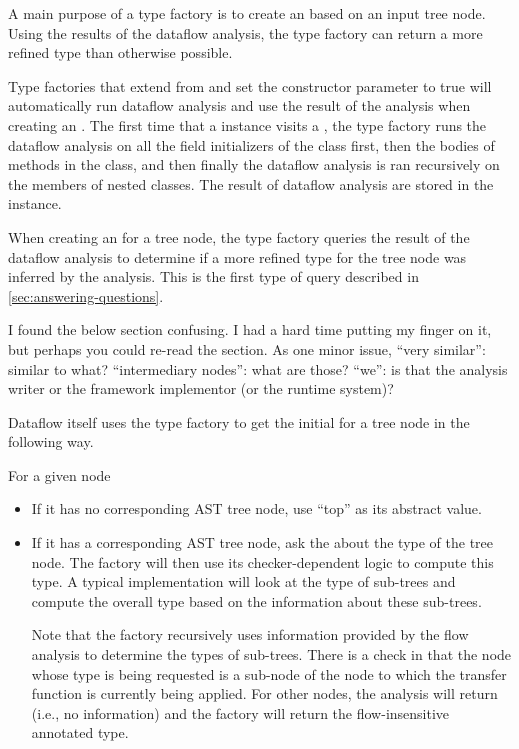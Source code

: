A main purpose of a type factory is to create an 
based on an input tree node. Using the results of the dataflow analysis,
the type factory can return a more refined type than otherwise possible.

Type factories that extend from 
and set the constructor parameter  to true will automatically
run dataflow analysis and use the result of the analysis when creating an
.  The first time that a 
instance visits a , the type factory runs the dataflow analysis on all the field initializers of the class first, then the bodies of methods in
the class, and then finally the dataflow analysis is
ran recursively on the members of nested classes. The result of
dataflow analysis are stored in the  instance.

When creating an  for a tree node, the type factory
queries the result of the dataflow analysis to determine if a more refined
type for the tree node was inferred by the analysis. This is the first
type of query described in \autoref{sec:answering-questions}.

\begin{workinprogress}
I found the below section confusing.  I had a hard time putting my finger
on it, but perhaps you could re-read the section.  As one minor issue,
``very similar'':  similar to what?  ``intermediary nodes'':  what are
those?  ``we'':  is that the analysis writer or the framework implementor
(or the runtime system)?
\end{workinprogress}

Dataflow itself uses the type factory to get the initial
 for a tree node in the following way.

For a given node 
\begin{itemize}
\item
    If it has no corresponding AST tree node, use ``top'' as its
    abstract value.
\item
    If it has a corresponding AST tree node, ask the
     about the type of the tree node.  The
    factory will then use its checker-dependent logic to compute this
    type.  A typical implementation will look at the type of sub-trees
    and compute the overall type based on the information about these
    sub-trees.

    Note that the factory recursively uses information provided by the
    flow analysis to determine the types of sub-trees.  There is a
    check in  that the node whose type is
    being requested is a sub-node of the node to which the transfer
    function is currently being applied.  For other nodes, the
    analysis will return  (i.e., no information) and the
    factory will return the flow-insensitive annotated type.

\end{itemize}

